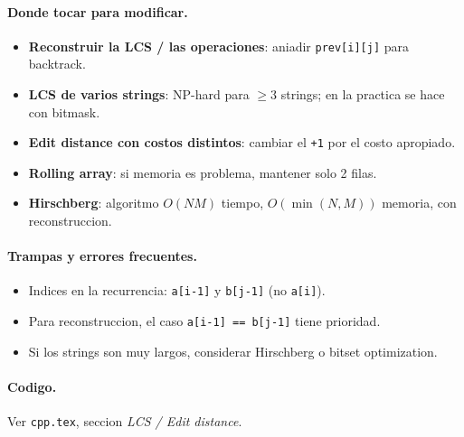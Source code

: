 \paragraph{Donde tocar para modificar.}
\begin{itemize}\setlength\itemsep{0pt}
	\item \textbf{Reconstruir la LCS / las operaciones}: aniadir \texttt{prev[i][j]} para backtrack.
	\item \textbf{LCS de varios strings}: NP-hard para $\ge 3$ strings; en la practica se hace con bitmask.
	\item \textbf{Edit distance con costos distintos}: cambiar el \texttt{+1} por el costo apropiado.
	\item \textbf{Rolling array}: si memoria es problema, mantener solo 2 filas.
	\item \textbf{Hirschberg}: algoritmo $O(NM)$ tiempo, $O(\min(N,M))$ memoria, con reconstruccion.
\end{itemize}

\paragraph{Trampas y errores frecuentes.}
\begin{itemize}\setlength\itemsep{0pt}
	\item Indices en la recurrencia: \texttt{a[i-1]} y \texttt{b[j-1]} (no \texttt{a[i]}).
	\item Para reconstruccion, el caso \texttt{a[i-1] == b[j-1]} tiene prioridad.
	\item Si los strings son muy largos, considerar Hirschberg o bitset optimization.
\end{itemize}

\paragraph{Codigo.}
Ver \texttt{cpp.tex}, seccion \textit{LCS / Edit distance}.

\vspace{0.5em}
